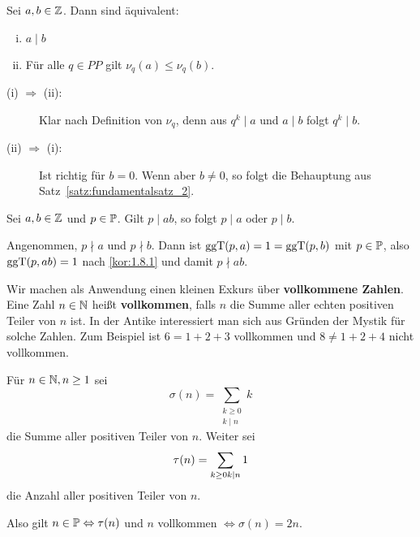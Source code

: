 	\begin{korollar}
		\label{kor:1.12}
		Sei $a,b \in \mathbb{Z}$. \marginnote{[12]}
		Dann sind äquivalent:
		\begin{enumerate}[(i)]
			\item $a \mid b$
			\item Für alle $q \in PP$ gilt $\nu_q(a) \leq \nu_q(b)$.
		\end{enumerate}
	\end{korollar}
	\begin{beweis}
		\begin{description}
			\item[(i) $\Rightarrow$ (ii):] Klar nach Definition von $\nu_q$, denn aus $q^k \mid a$ und $a \mid b$ folgt $q^k \mid b$.
			\item[(ii) $\Rightarrow$ (i):] Ist richtig für $b = 0$.
			Wenn aber $b \neq 0$, so folgt die Behauptung aus Satz~\ref{satz:fundamentalsatz_2}.
		\end{description}
	\end{beweis}

	\begin{lemma}
		\label{lemma:1.13}
		Sei $a,b \in \mathbb{Z}$ und $p \in \mathbb{P}$. \marginnote{[13]}
		Gilt $p \mid ab$, so folgt $p \mid a$ oder $p \mid b$.
	\end{lemma}

	\begin{beweis}
		Angenommen, $p \nmid a$ und $p \nmid b$.
		Dann ist $\operatorname{ggT}(p,a) = 1 = \operatorname{ggT}(p,b)$ mit $p \in \mathbb{P}$, also $\operatorname{ggT}(p,ab) = 1$ nach \ref{kor:1.8.1} und damit $p \nmid ab$.
	\end{beweis}

	Wir machen als Anwendung einen kleinen Exkurs über \textbf{vollkommene Zahlen}. 
	Eine Zahl $n \in \mathbb{N}$ heißt \textbf{vollkommen}, falls $n$ die Summe aller echten positiven Teiler von $n$ ist.
	In der Antike interessiert man sich aus Gründen der Mystik für solche Zahlen.
	Zum Beispiel ist $6 = 1 + 2 + 3$ vollkommen und $8 \neq 1 + 2 + 4$ nicht vollkommen.
	\newpage
	\begin{definition}
		Für $n \in \mathbb{N}, n \geq 1$ sei \marginnote{[14]}
		\[
			\sigma(n) = \sum_{\substack{k \geq 0 \\ k \mid n}} k
		\]
		die Summe aller positiven Teiler von $n$.
		Weiter sei
		\[
			\tau(n) = \sum_{\substack{k \geq 0} \\ k \mid n} 1
		\]
		die Anzahl aller positiven Teiler von $n$.
	\end{definition}
	Also gilt $n \in \mathbb{P} \Leftrightarrow \tau(n)$ und $n$ vollkommen $\Leftrightarrow \sigma(n) = 2n$.
	
